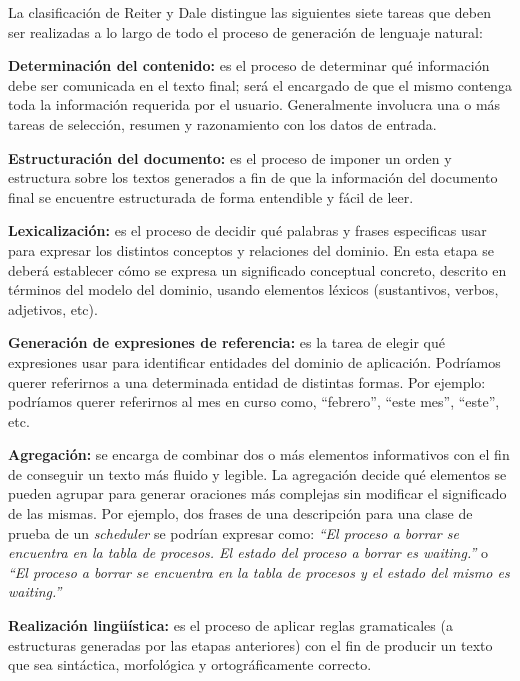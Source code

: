 La clasificación de Reiter y Dale distingue las siguientes siete tareas que deben ser realizadas a lo largo de todo el proceso de generación de lenguaje natural: 

\bigskip
\noindent
\textbf{Determinación del contenido:} es el proceso de determinar qué información debe ser comunicada en el texto final; será el encargado de que el mismo contenga toda la información requerida por el usuario. Generalmente involucra una o más tareas de selección, resumen y razonamiento con los datos de entrada.

\bigskip
\noindent
\textbf{Estructuración del documento:} es el proceso de imponer un orden y estructura sobre los textos generados a fin de que la información del documento final se encuentre estructurada de forma entendible y fácil de leer.

\bigskip
\noindent
\textbf{Lexicalización:} es el proceso de decidir qué palabras y frases especificas usar para expresar los distintos conceptos y relaciones del dominio. En esta etapa se deberá establecer cómo se expresa un significado conceptual concreto, descrito en términos del modelo del dominio, usando elementos léxicos (sustantivos, verbos, adjetivos, etc).

\bigskip
\noindent
\textbf{Generación de expresiones de referencia:} es la tarea de elegir qué expresiones usar para identificar entidades del dominio de aplicación. Podríamos querer referirnos a una determinada entidad de distintas formas. Por ejemplo: podríamos querer referirnos al mes en curso como, ``febrero'', ``este mes'', ``este'', etc.

\bigskip
\noindent
\textbf{Agregación:} se encarga de combinar dos o más elementos informativos con el fin de conseguir un texto más fluido y legible. La agregación decide qué elementos se pueden agrupar para generar oraciones más complejas sin modificar el significado de las mismas. Por ejemplo, dos frases de una descripción para una clase de prueba de un \textit{scheduler} se podrían expresar como:
\emph{``El proceso a borrar se encuentra en la tabla de procesos. El estado del proceso a borrar es waiting.''} o \emph{``El proceso a borrar se encuentra en la tabla de procesos y el estado del mismo es waiting.''}

\bigskip
\noindent
\textbf{Realización lingüística:} es el proceso de aplicar reglas gramaticales (a estructuras generadas por las etapas anteriores) con el fin de producir un texto que sea sintáctica, morfológica y ortográficamente correcto.


